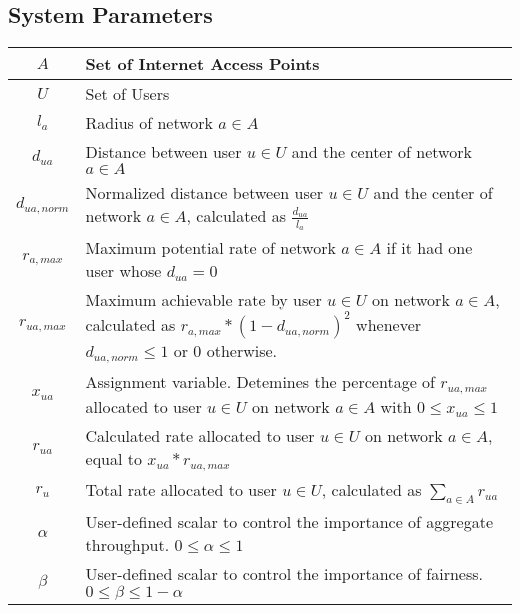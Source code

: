 \documentclass[11pt]{article}
\begin{document}
\subsection{System Parameters}
\begin{center}
\renewcommand\arraystretch{1.3}
\begin{tabular}{| c | p{12cm} |}
\hline
$A$ & Set of Internet Access Points \\ 
\hline
$U$ & Set of Users \\ 
\hline
$l_a$ & Radius of network $a \in A$ \\
\hline
$d_{ua}$ & Distance between user $u \in U$ and the center of network $a \in A$ \\ 
\hline
$d_{ua,norm}$ & Normalized distance between user $u \in U$ and the center of network $a \in A$, calculated as $\displaystyle\frac{d_{ua}}{l_a}$ \\[8pt] 
\hline
$r_{a,max}$ & Maximum potential rate of network $a \in A$ if it had one user whose $d_{ua} = 0$ \\ 
\hline
$r_{ua,max}$ & Maximum achievable rate by user $u \in U$ on network $a \in A$, calculated as $r_{a,max} * (1 - d_{ua,norm})^2$ whenever $d_{ua,norm} \leq 1$ or 0 otherwise. \\[8pt] 
\hline
$x_{ua}$ & Assignment variable. Detemines the percentage of $r_{ua,max}$ allocated to user $u \in U$ on network $a \in A$ with $0 \leq x_{ua} \leq 1$ \\ 
\hline
$r_{ua}$ & Calculated rate allocated to user $u \in U$ on network $a \in A$, equal to $x_{ua} * r_{ua,max}$ \\ 
\hline
$r_{u}$ & Total rate allocated to user $u \in U$, calculated as $\sum_{a \in A} r_{ua}$ \\ 
\hline
$\alpha$ & User-defined scalar to control the importance of aggregate throughput. $0 \leq \alpha \leq 1$ \\
\hline
$\beta$ & User-defined scalar to control the importance of fairness. $0 \leq \beta \leq 1 - \alpha$ \\
\hline
\end{tabular}
\end{center}
\pagebreak
\end{document}

